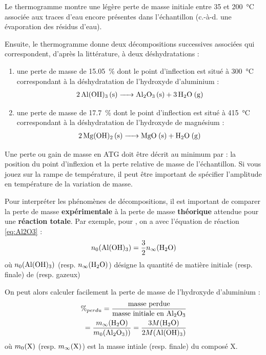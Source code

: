 \documentclass[twoside,a4paper,11pt,addpoints,answers]{exam}%
\begin{document}
Le thermogramme montre une légère perte de masse initiale entre 35 et \SI{200}{\celsius} associée aux traces d'eau encore présentes dans l'échantillon (c.-à-d. une évaporation des résidus d'eau).

Ensuite, le thermogramme donne deux décompositions successives associées qui correspondent, d'après la littérature, à deux déshydratations : 
\begin{enumerate}
\item une perte de masse de \SI{15.05}{\percent} dont le point d'inflection est situé à \SI{300}{\celsius} correspondant à la déshydratation de l'hydroxyde d'aluminium : 
\begin{align}
\ce{2 Al(OH)3 (s) -> Al2O3 (s) + 3 H2O (g)} \label{eq:Al2O3}
\end{align}
\item une perte de masse de \SI{17.7}{\percent} dont le point d'inflection est situé à \SI{415}{\celsius} correspondant à la déshydratation de l'hydroxyde de magnésium : 
\begin{align}
\ce{2 Mg(OH)2 (s) -> MgO (s) + H2O (g)} \label{eq:MgO}
\end{align}
\end{enumerate}

Une perte ou gain de masse en ATG doit être décrit au minimum par : la position du point d'inflexion et la perte relative de masse de l'échantillon. Si vous jouez sur la rampe de température, il peut être important de spécifier l'amplitude en température de la variation de masse.

Pour interpréter les phénomènes de décompositions, il est important de comparer la perte de masse \textbf{expérimentale} à la perte de masse \textbf{théorique} attendue pour une \textbf{réaction totale}. Par exemple, pour , on a avec l'équation de réaction \ref{eq:Al2O3} :
\begin{align*}
n_0 ( \ce{Al(OH)3} ) = \frac{3}{2} n_\infty ( \ce{H2O} )
\end{align*}
où $n_0 ( \ce{Al(OH)3} )$ (resp. $n_\infty ( \ce{H2O} )$) désigne la quantité de matière initiale (resp. finale) de  (resp.  gazeux)

On peut alors calculer facilement la perte de masse de l'hydroxyde d'aluminium : 
\begin{align*}
\%_{perdu} = \frac{\text{masse perdue}}{\text{masse initiale en \ce{Al2O3}}} \\
= \frac{m_\infty ( \ce{H2O} )}{m_0 ( \ce{Al2O3} ) )} = \frac{3 M( \ce{H2O} )}{2 M( \ce{Al(OH)3} )}
\end{align*}
où $m_0 ( \ce{X} )$ (resp. $m_\infty ( \ce{X} )$) est la masse intiale (resp. finale) du composé X.
\end{document}
